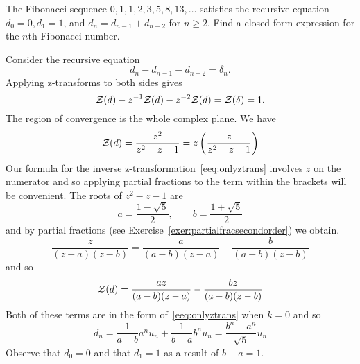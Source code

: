 \begin{excersizelist}
\item \label{exer:fibonacci} The Fibonacci sequence $0,1,1,2,3,5,8,13,\dots$ satisfies the recursive equation $d_0 = 0, d_1 = 1$, and $d_n = d_{n-1} + d_{n-2}$ for $n \geq 2$.  Find a closed form expression for the $n$th Fibonacci number.
\begin{solution}
Consider the recursive equation
\[
d_n - d_{n-1} - d_{n-2} = \delta_{n}.
\]
Applying z-transforms to both sides gives
\[
{\mathcal Z}(d) - z^{-1} {\mathcal Z}(d) - z^{-2} {\mathcal Z}(d) = {\mathcal Z}(\delta) = 1.
\]
The region of convergence is the whole complex plane.  We have
\[
{\mathcal Z}(d) = \frac{z^2}{z^2 - z - 1} = z \left( \frac{z}{z^2 - z - 1} \right)
\]
Our formula for the inverse z-transformation~\eqref{eeq:onlyztrans} involves $z$ on the numerator and so applying partial fractions to the term within the brackets will be convenient.  The roots of $z^2 - z - 1$ are
\[
a = \frac{1-\sqrt{5}}{2}, \qquad b = \frac{1+\sqrt{5}}{2}
\]
and by partial fractions (see Exercise~\ref{exer:partialfracsecondorder}) we obtain.
\[
\frac{z}{(z-a)(z-b)} = \frac{a}{(a-b) (z-a)}-\frac{b}{(a-b) (z-b)}
\]
and so
\[
{\mathcal Z}(d) = \frac{az}{(a-b) (z-a)}-\frac{bz}{(a-b) (z-b)}
\]
Both of these terms are in the form of~\eqref{eeq:onlyztrans} when $k=0$ and so
\[
d_n = \frac{1}{a-b} a^n u_n + \frac{1}{b-a} b^n u_n = \frac{b^n - a^n}{\sqrt{5}} u_n
\]
Observe that $d_0 = 0$ and that $d_1 = 1$ as a result of $b - a = 1$.
\end{solution}


\end{excersizelist}









